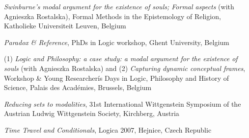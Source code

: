 \documentclass[10pt, a4paper]{article}
\newcommand{\years}[1]{\marginnote{\normalsize #1}}
\begin{document}
\emph{Swinburne's modal argument for the existence of souls; Formal aspects} (with Agnieszka Rostalska),  Formal Methods in the Epistemology of Religion,   Katholieke Universiteit Leuven, Belgium


\vspace{0.5mm}




  \emph{Paradox \& Reference},   PhDs in Logic workshop,    Ghent University, Belgium


\vspace{0.5mm}





(1) \emph{Logic and Philosophy: a case study: a modal argument for the existence of souls}  (with Agnieszka  Rostalska) and (2) \emph{Capturing dynamic conceptual frames}, Workshop \& Young Researcherís Days in Logic, Philosophy and History of Science,  Palais des Acad\'emies, Brussels, Belgium






\vspace{0.5mm}


 \emph{Reducing sets to modalities}, 31st  International \mbox{Wittgenstein} Symposium of the Austrian Ludwig \mbox{Wittgenstein} Society,  Kirchberg, Austria



\vspace{0.5mm}










 \emph{Time Travel and Conditionals},   Logica 2007,   Hejnice, Czech Republic



\end{document}
